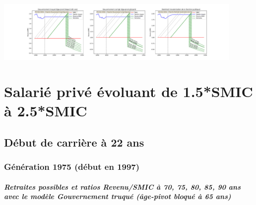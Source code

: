  \begin{center}\includegraphics[width=0.9\textwidth]{fig/Ascendant12_2003_22_dest_retraite.pdf}\end{center} \label{fig/Ascendant12_2003_22_dest_retraite.pdf} 

\newpage 
 
\chapter{Salarié privé évoluant de 1.5*SMIC à 2.5*SMIC} 


 \addto{\captionsenglish}{ \renewcommand{\mtctitle}{}} \setcounter{minitocdepth}{2} 
 \minitoc \newpage 

\section{Début de carrière à 22 ans} 

\subsection{Génération 1975 (début en 1997)} 

\paragraph{Retraites possibles et ratios Revenu/SMIC à 70, 75, 80, 85, 90 ans avec le modèle \emph{Gouvernement truqué (âge-pivot bloqué à 65 ans)}}  
 
